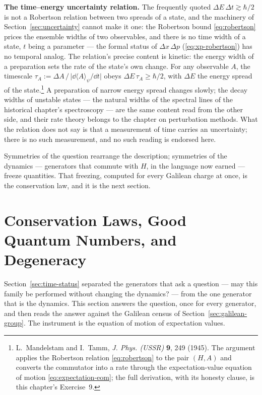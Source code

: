 \textbf{The time--energy uncertainty relation.} The frequently quoted $\Delta E\,\Delta t \gtrsim \hbar/2$ is not a Robertson relation between two spreads of a state, and the machinery of Section~\ref{sec:uncertainty} cannot make it one: the Robertson bound \eqref{eq:robertson} prices the ensemble widths of two observables, and there is no time width of a state, $t$ being a parameter --- the formal status of $\Delta x\,\Delta p$ (\eqref{eq:xp-robertson}) has no temporal analog. The relation's precise content is kinetic: the energy width of a preparation sets the rate of the state's own change. For any observable $A$, the timescale $\tau_A := \Delta A\,/\,\bigl|\dd\langle A\rangle_\psi/\dd t\bigr|$ obeys $\Delta E\,\tau_A \geq \hbar/2$, with $\Delta E$ the energy spread of the state.\footnote{L.~Mandelstam and I.~Tamm, \emph{J. Phys. (USSR)} \textbf{9}, 249 (1945). The argument applies the Robertson relation \eqref{eq:robertson} to the pair $(H,A)$ and converts the commutator into a rate through the expectation-value equation of motion \eqref{eq:expectation-eom}; the full derivation, with its honesty clause, is this chapter's Exercise~9.} A preparation of narrow energy spread changes slowly; the decay widths of unstable states --- the natural widths of the spectral lines of the historical chapter's spectroscopy --- are the same content read from the other side, and their rate theory belongs to the chapter on perturbation methods. What the relation does not say is that a measurement of time carries an uncertainty; there is no such measurement, and no such reading is endorsed here.

Symmetries of the question rearrange the description; symmetries of the dynamics --- generators that commute with $H$, in the language now earned --- freeze quantities. That freezing, computed for every Galilean charge at once, is the conservation law, and it is the next section.

\section{Conservation Laws, Good Quantum Numbers, and Degeneracy}
\label{sec:conservation}

Section~\ref{sec:time-status} separated the generators that ask a question --- may this family be performed without changing the dynamics? --- from the one generator that is the dynamics. This section answers the question, once for every generator, and then reads the answer against the Galilean census of Section~\ref{sec:galilean-group}. The instrument is the equation of motion of expectation values.

